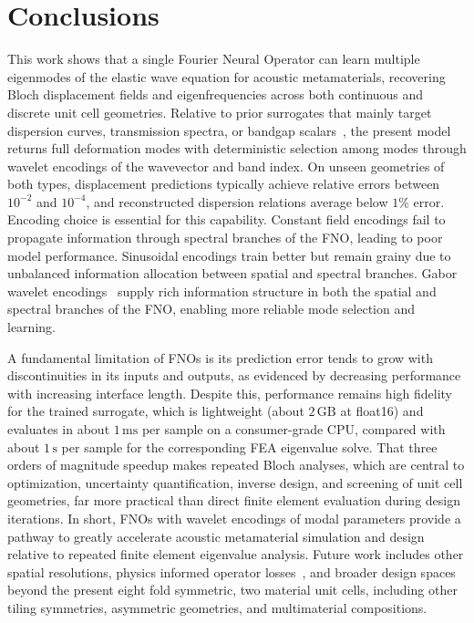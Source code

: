 \documentclass[preprint,review,12pt,numafflabel]{elsarticle}
\begin{document}
\section{Conclusions}
\label{sec:Conclusion}
This work shows that a single Fourier Neural Operator can learn multiple eigenmodes of the elastic wave equation for acoustic metamaterials, recovering Bloch displacement fields and eigenfrequencies across both continuous and discrete unit cell geometries. Relative to prior surrogates that mainly target dispersion curves, transmission spectra, or bandgap scalars~\cite{Ogren2024gpr,wagner2024neural,liu2026hybridfno}, the present model returns full deformation modes with deterministic selection among modes through wavelet encodings of the wavevector and band index. On unseen geometries of both types, displacement predictions typically achieve relative errors between $10^{-2}$ and $10^{-4}$, and reconstructed dispersion relations average below $1\%$ error. Encoding choice is essential for this capability. Constant field encodings fail to propagate information through spectral branches of the FNO, leading to poor model performance. Sinusoidal encodings train better but remain grainy due to unbalanced information allocation between spatial and spectral branches. Gabor wavelet encodings~\cite{gabor1946theory} supply rich information structure in both the spatial and spectral branches of the FNO, enabling more reliable mode selection and learning.

A fundamental limitation of FNOs is its prediction error tends to grow with discontinuities in its inputs and outputs, as evidenced by decreasing performance with increasing interface length. Despite this, performance remains high fidelity for the trained surrogate, which is lightweight (about $2\,\mathrm{GB}$ at float16) and evaluates in about $1\,\mathrm{ms}$ per sample on a consumer-grade CPU, compared with about $1\,\mathrm{s}$ per sample for the corresponding FEA eigenvalue solve. That three orders of magnitude speedup makes repeated Bloch analyses, which are central to optimization, uncertainty quantification, inverse design, and screening of unit cell geometries, far more practical than direct finite element evaluation during design iterations. In short, FNOs with wavelet encodings of modal parameters provide a pathway to greatly accelerate acoustic metamaterial simulation and design relative to repeated finite element eigenvalue analysis. Future work includes other spatial resolutions, physics informed operator losses~\cite{wang2021pidon}, and broader design spaces beyond the present eight fold symmetric, two material unit cells, including other tiling symmetries, asymmetric geometries, and multimaterial compositions.
\end{document}
